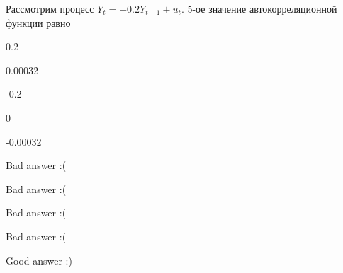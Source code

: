 
\begin{question}
Рассмотрим процесс \(Y_t = -0.2 Y_{t-1} + u_t\). 5-ое значение автокорреляционной функции равно
\begin{answerlist}
  \item 0.2
  \item 0.00032
  \item -0.2
  \item 0
  \item -0.00032
\end{answerlist}
\end{question}

\begin{solution}
\begin{answerlist}
  \item Bad answer :(
  \item Bad answer :(
  \item Bad answer :(
  \item Bad answer :(
  \item Good answer :)
\end{answerlist}
\end{solution}


